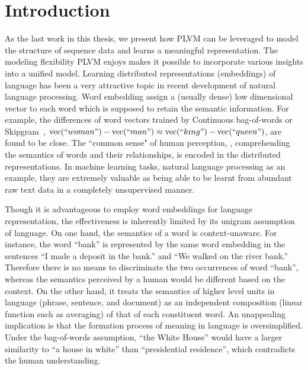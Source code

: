 \section{Introduction}

As the last work in this thesis, we present how PLVM can be leveraged to model
the structure of sequence data and learns a meaningful representation. The
modeling flexibility PLVM enjoys makes it possible to incorporate various
insights into a unified model.  Learning distributed representations
(embeddings) of language has been a very attractive topic in recent development
of natural language processing. Word embedding assign a (usually dense) low
dimensional vector to each word which is supposed to retain the semantic
information. For example, the differences of word vectors trained by Continuous
bag-of-words or Skipgram~\cite{mikolov2013distributed}, $\text{vec}(``woman") -
\text{vec}(``man") \approx \text{vec}(``king") - \text{vec}(``queen")$, are
found to be close. The ``common sense" of human perception, \ie, comprehending
the semantics of words and their relationships, is encoded in the distributed
representations. In machine learning tasks, natural language processing as an
example, they are extremely valuable as being able to be learnt from abundant
raw text data in a completely unsupervised manner.

Though it is advantageous to employ word embeddings for language representation,
the effectiveness is inherently limited by its unigram assumption of language.
On one hand, the semantics of a word is context-unaware. For instance, the word
``bank'' is represented by the same word embedding in the sentences ``I made a
deposit in the bank.'' and ``We walked on the river bank.'' Therefore there is
no means to discriminate the two occurrences of word ``bank'', whereas the
semantics perceived by a human would be different based on the context. On the
other hand, it treats the semantics of higher level units in language (phrase,
sentence, and document) as an independent composition (linear function such as
averaging) of that of each constituent word. An unappealing implication is that
the formation process of meaning in language is oversimplified. Under the
bag-of-words assumption, ``the White House'' would have a larger similarity to
``a house in white'' than ``presidential residence'', which contradicts the
human understanding.

